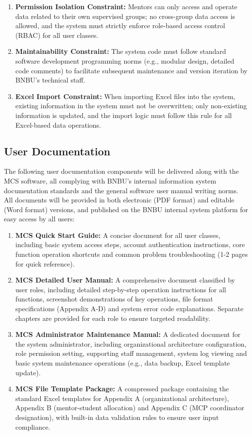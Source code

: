 \begin{enumerate}
\item \textbf{Permission Isolation Constraint:} Mentors can only access and operate data related to their own supervised groups; no cross-group data access is allowed, and the system must strictly enforce role-based access control (RBAC) for all user classes.
\item \textbf{Maintainability Constraint:} The system code must follow standard software development programming norms (e.g., modular design, detailed code comments) to facilitate subsequent maintenance and version iteration by BNBU's technical staff.
\item \textbf{Excel Import Constraint:} When importing Excel files into the system, existing information in the system must not be overwritten; only non-existing information is updated, and the import logic must follow this rule for all Excel-based data operations.
\end{enumerate}

\subsection{User Documentation}

The following user documentation components will be delivered along with the MCS software, all complying with BNBU's internal information system documentation standards and the general software user manual writing norms. All documents will be provided in both electronic (PDF format) and editable (Word format) versions, and published on the BNBU internal system platform for easy access by all users:

\begin{enumerate}
\item \textbf{MCS Quick Start Guide:} A concise document for all user classes, including basic system access steps, account authentication instructions, core function operation shortcuts and common problem troubleshooting (1-2 pages for quick reference).

\item \textbf{MCS Detailed User Manual:} A comprehensive document classified by user roles, including detailed step-by-step operation instructions for all functions, screenshot demonstrations of key operations, file format specifications (Appendix A-D) and system error code explanations. Separate chapters are provided for each role to ensure targeted readability.

\item \textbf{MCS Administrator Maintenance Manual:} A dedicated document for the system administrator, including organizational architecture configuration, role permission setting, supporting staff management, system log viewing and basic system maintenance operations (e.g., data backup, Excel template update).

\item \textbf{MCS File Template Package:} A compressed package containing the standard Excel templates for Appendix A (organizational architecture), Appendix B (mentor-student allocation) and Appendix C (MCP coordinator designation), with built-in data validation rules to ensure user input compliance.
\end{enumerate}


